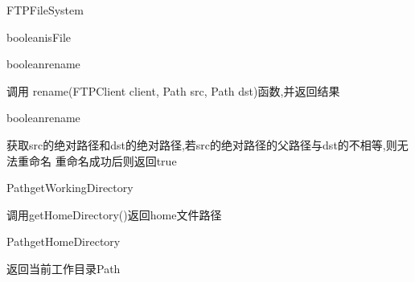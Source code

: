 \begin{XeClass}{FTPFileSystem}
\begin{XeMethod}{\XePrivate}{boolean}{isFile}
    \end{XeMethod}

    \begin{XeMethod}{\XePublic}{boolean}{rename}
         
 调用 rename(FTPClient client, Path src, Path dst)函数,并返回结果

    \end{XeMethod}

    \begin{XeMethod}{\XePrivate}{boolean}{rename}
         
 获取src的绝对路径和dst的绝对路径,若src的绝对路径的父路径与dst的不相等,则无法重命名
 重命名成功后则返回true

    \end{XeMethod}

    \begin{XeMethod}{\XePublic}{Path}{getWorkingDirectory}
         
 调用getHomeDirectory()返回home文件路径

    \end{XeMethod}

    \begin{XeMethod}{\XePublic}{Path}{getHomeDirectory}
         
 返回当前工作目录Path

    \end{XeMethod}

\end{XeClass}
